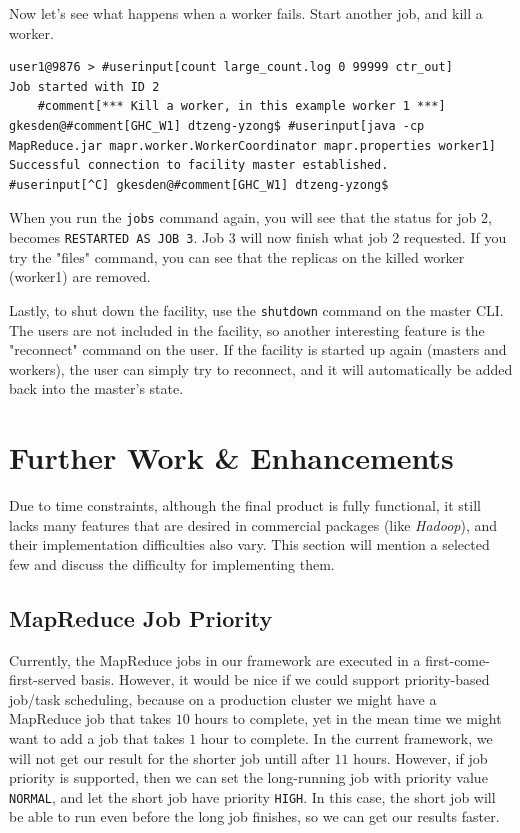 \documentclass{article} %
\begin{document}
\par Now let's see what happens when a worker fails.  Start another job, and kill a worker.
\begin{Verbatim}[fontsize=\scriptsize, xleftmargin=-.2in,commandchars=\#\[\]]
user1@9876 > #userinput[count large_count.log 0 99999 ctr_out]
Job started with ID 2
	#comment[*** Kill a worker, in this example worker 1 ***]
gkesden@#comment[GHC_W1] dtzeng-yzong$ #userinput[java -cp MapReduce.jar mapr.worker.WorkerCoordinator mapr.properties worker1]
Successful connection to facility master established.
#userinput[^C] gkesden@#comment[GHC_W1] dtzeng-yzong$
\end{Verbatim}
\par\qquad When you run the \texttt{jobs} command again, you will see that the status for job 2, becomes \texttt{RESTARTED AS JOB 3}.  Job 3 will now finish what job 2 requested.  If you try the "files" command, you can see that the replicas on the killed worker (worker1) are removed.
\par\qquad Lastly, to shut down the facility, use the \texttt{shutdown} command on the master CLI.  The users are not included in the facility, so another interesting feature is the "reconnect" command on the user.  If the facility is started up again (masters and workers), the user can simply try to reconnect, and it will automatically be added back into the master's state.

\section{Further Work \& Enhancements}

\par\qquad Due to time constraints, although the final product is fully functional, it still lacks many features that are desired in commercial packages (like \emph{Hadoop}), and their implementation difficulties also vary. This section will mention a selected few and discuss the difficulty for implementing them.

\subsection{MapReduce Job Priority}
    \par\qquad Currently, the MapReduce jobs in our framework are executed in a first-come-first-served basis. However, it would be nice if we could support priority-based job/task scheduling, because on a production cluster we might have a MapReduce job that takes $10$ hours to complete, yet in the mean time we might want to add a job that takes $1$ hour to complete. In the current framework, we will not get our result for the shorter job untill after $11$ hours. However, if job priority is supported, then we can set the long-running job with priority value \texttt{NORMAL}, and let the short job have priority \texttt{HIGH}. In this case, the short job will be able to run even before the long job finishes, so we can get our results faster.
    
\end{document}
